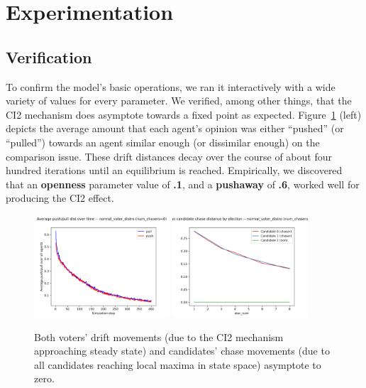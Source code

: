 \section{Experimentation}
\label{sec:experimentation}

\subsection{Verification}

To confirm the model's basic operations, we ran it interactively with a wide
variety of values for every parameter. We verified, among other things, that
the CI2 mechanism does asymptote towards a fixed point as expected.
Figure~\ref{drifts_and_chases_asymptote} (left) depicts the average amount that each
agent's opinion was either ``pushed'' (or ``pulled'') towards an agent similar
enough (or dissimilar enough) on the comparison issue. These drift distances
decay over the course of about four hundred iterations until an equilibrium is
reached. Empirically, we discovered that an \textbf{openness} parameter value
of \textbf{.1}, and a \textbf{pushaway} of \textbf{.6}, worked well for
producing the CI2 effect.

\begin{figure}[ht]
\centering
\includegraphics[width=0.45\textwidth]{assets/drifts_asymptote.png}
\includegraphics[width=0.45\textwidth]{assets/chase_dists_asymptote.png}
\caption{Both voters' drift movements (due to the CI2 mechanism approaching steady
state) and candidates' chase movements (due to all candidates reaching local
maxima in state space) asymptote to zero.}
\label{drifts_and_chases_asymptote}
\end{figure}

